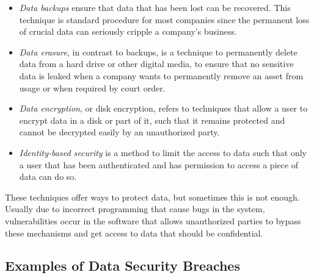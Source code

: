 \begin{itemize}
    \setlength\itemsep{1em}

    \item \textit{Data backups} ensure that data that has been lost can be recovered. This technique is standard procedure for most companies since the permanent loss of crucial data can seriously cripple a company's business.

    \item \textit{Data erasure}, in contrast to backups, is a technique to permanently delete data from a hard drive or other digital media, to ensure that no sensitive data is leaked when a company wants to permanently remove an asset from usage or when required by court order.

    \item \textit{Data encryption}, or disk encryption, refers to techniques that allow a user to encrypt data in a disk or part of it, such that it remains protected and cannot be decrypted easily by an unauthorized party.

    \item \textit{Identity-based security} is a method to limit the access to data such that only a user that has been authenticated and has permission to access a piece of data can do so.


\end{itemize}


These techniques offer ways to protect data, but sometimes this is not enough. Usually due to incorrect programming that cause bugs in the system, vulnerabilities occur in the software that allows unauthorized parties to bypass these mechanisms and get access to data that should be confidential.



\subsection{Examples of Data Security Breaches} 
\label{ssec:ExamplesDataSecurityBreaches}


